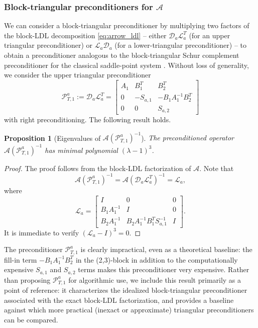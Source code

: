 \documentclass{article}
\newtheorem{proposition}{Proposition}
\newcommand{\sA}{\mathcal{A}}
\begin{document}
\subsubsection{Block-triangular preconditioners for $\sA$}
We can  consider a block-triangular preconditioner by multiplying two factors of the block-LDL decomposition \eqref{eq:arrow_ldl} -- either $\mathcal{D}_a \mathcal{L}_a^T$ (for an upper triangular preconditioner) or $\mathcal{L}_a \mathcal{D}_a$ (for a lower-triangular preconditioner) -- to obtain a preconditioner analogous to the block-triangular Schur complement preconditioner for the classical saddle-point system  \cite{i01}. Without loss of generality, we consider the upper triangular preconditioner
\begin{equation}
    \mathcal{P}_{T,1}^a := \mathcal{D}_a\mathcal{L}_a^T = \begin{bmatrix}
        A_1 & B_1^T & B_2^T \\
        0 & -S_{a,1} & -B_1A_1^{-1}B_2^T \\
        0 & 0 & S_{a,2}
    \end{bmatrix}
\end{equation}
with right preconditioning. The following result holds.

\begin{proposition}[Eigenvalues of $ \sA (\mathcal{P}_{T,1}^a)^{-1}$]
    The preconditioned operator \\ $\sA (\mathcal{P}_{T,1}^a)^{-1}$ has minimal polynomial $(\lambda - 1)^3$.  
\end{proposition}

\begin{proof}
The proof follows from the block-LDL factorization of $\sA$. Note that 
\[
\sA  (\mathcal{P}_{T,1}^a)^{-1} = \sA (\mathcal{D}_a\mathcal{L}_a^T)^{-1} = \mathcal{L}_a,
\]
where
\[
\mathcal{L}_a = \begin{bmatrix}
    I & 0 & 0 \\
    B_1A_1^{-1} & I & 0 \\
    B_2A_1^{-1} & B_2A_1^{-1}B_1^T S_{a,1}^{-1} & I
\end{bmatrix}.
\]
It is immediate to verify  $(\mathcal{L}_a - I)^3 = 0$.
\end{proof}

The preconditioner $\mathcal{P}_{T,1}^a$ is clearly impractical, even as a theoretical baseline: the fill-in term $-B_1A_1^{-1}B_2^T$ in the (2,3)-block in addition to the computationally expensive $S_{a,1}$ and $S_{a,2}$ terms makes this preconditioner very expensive. Rather than proposing $\mathcal{P}_{T,1}^a$ for algorithmic use, we include this result primarily as a point of reference: it characterizes the idealized block-triangular preconditioner associated with the exact block‑LDL factorization, and provides a baseline against which more practical (inexact or approximate) triangular preconditioners can be compared.
\end{document}
